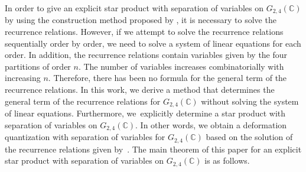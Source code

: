 \documentclass[pdftex]{sigma}
\numberwithin{equation}{section}
\begin{document}
In order to give an explicit star product with separation of variables on $G_{2,4}(\mathbb{C})$ by using the construction method proposed by \cite{HS1,HS2}, it is necessary to solve the recurrence relations. However, if we attempt to solve the recurrence relations sequentially order by order, we need to solve a system of linear equations for each order. In addition, the recurrence relations contain variables given by the four partitions of order $n$. The number of variables increases combinatorially with increasing $n$. Therefore, there has been no formula for the general term of the recurrence relations. In this work, we derive a method that
determines the general term of the recurrence relations for $G_{2,4}(\mathbb{C})$ without solving the system of linear equations. Furthermore, we~explicitly determine a star product with separation of variables on $G_{2,4}(\mathbb{C})$.
In other words, we obtain a deformation quantization with separation of variables for $G_{2,4}(\mathbb{C})$ based on the solution of the recurrence relations given by~\cite{HS1,HS2}. The main theorem of this paper for an explicit star product with separation of variables on $G_{2,4}(\mathbb{C})$ is as follows.
\end{document}
